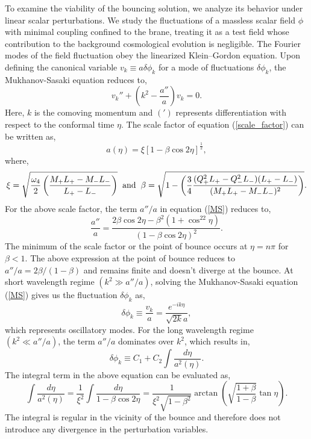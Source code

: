 \documentclass[12pt]{article}
\begin{document}
To examine the viability of the bouncing solution, we analyze its behavior under linear scalar perturbations. We study the fluctuations of a massless scalar field $\phi$ with minimal coupling confined to the brane, treating it as a test field whose contribution to the background cosmological evolution is negligible. The Fourier modes of the field fluctuation obey the linearized Klein–Gordon equation. Upon defining the canonical variable $v_k\equiv a\delta \phi_k$ for a mode of fluctuations $\delta \phi_k$, the Mukhanov-Sasaki equation reduces to,
\begin{equation}\label{MS}
	v_k'' + (k^2-\frac{a''}{a})v_k=0.
\end{equation}
Here, $k$ is the comoving momentum and $(')$ represents differentiation with respect to the conformal time $\eta$. The scale factor of equation (\ref{scale_factor}) can be written as,
\begin{equation}
a(\eta)=\xi\left[1-\beta \cos2\eta\right]^{\frac{1}{2}}, 
\end{equation}
where,
\begin{equation}
	\xi=\sqrt{\frac{\omega_4}{2}\left(\frac{M_+L_+-M_-L_-}{L_+-L_-}\right)}\hspace{0.2 cm} \text{and}\hspace{0.2 cm}\beta=\sqrt{1-\left(\frac{3}{4}\frac{(Q_+^2L_+-Q_-^2L_-)(L_+-L_-)}{(M_+L_+-M_-L_- )^2}\right)}.
\end{equation}
For the above scale factor, the term $a''/a$ in equation (\ref{MS}) reduces to,
\begin{equation}\label{}
	\frac{a''}{a}=\frac{2\beta \cos 2 \eta -\beta^2(1+\cos^22\eta)}{(1-\beta \cos 2 \eta)^2}.
\end{equation} 
The minimum of the scale factor or the point of bounce occurs at $\eta=n \pi$ for $\beta<1$. The above expression at the point of bounce reduces to $a''/a=2\beta/(1-\beta)$ and remains finite and doesn't diverge at the bounce. At short wavelength regime $(k^2\gg a''/a)$, solving the Mukhanov-Sasaki equation (\ref{MS}) gives us the fluctuation $\delta \phi_k$ as, 
\begin{equation}
	\delta \phi_k \equiv \frac{v_k}{a}= \frac{ e^{-ik\eta}}{\sqrt{2k}a},			
\end{equation}
which represents oscillatory modes.
 For the long wavelength regime $(k^2\ll a''/a)$, the term $a''/a$ dominates over $k^2$, which results in,
\begin{equation}
	\delta \phi_k\equiv C_1 +C_2 \int \frac{d\eta}{a^2(\eta)}.
\end{equation}
The integral term in the above equation can be evaluated as,
\begin{equation}
	\int \frac{d\eta}{a^2(\eta)}=\frac{1}{\xi^2}\int \frac{d\eta}{1-\beta \cos 2 \eta}=\frac{1}{\xi^2\sqrt{1-\beta^2}}\arctan\left(\sqrt{\frac{1+\beta}{1-\beta}}\tan \eta\right).
\end{equation}
The integral is regular in the vicinity of the bounce and therefore does not introduce any divergence in the perturbation variables.
\end{document}
